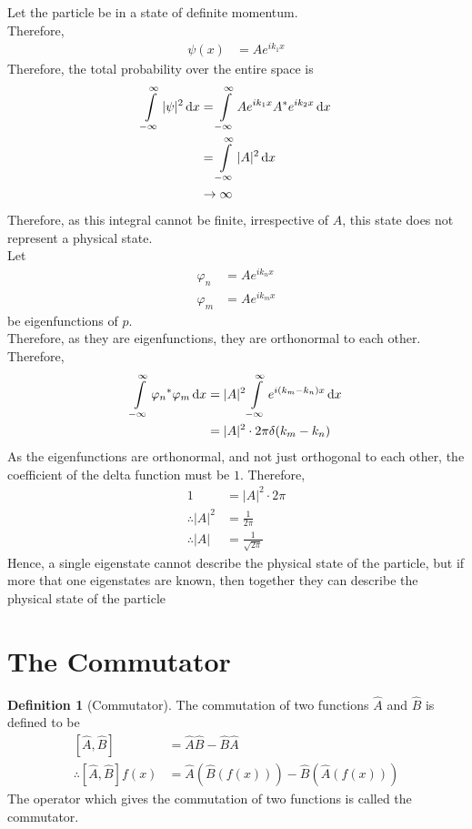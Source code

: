 \documentclass[titlepage, fleqn, a4paper, 12pt, twoside]{article}
\theoremstyle{definition}
\newtheorem{definition}{Definition}
\theoremstyle{theorem}
\begin{document}
Let the particle be in a state of definite momentum.\\
Therefore,
\begin{align*}
	\psi(x) &= A e^{i k_1 x}
\end{align*}
Therefore, the total probability over the entire space is
\begin{align*}
	\int\limits_{-\infty}^{\infty} |\psi|^2 \dif x &= \int\limits_{-\infty}^{\infty} A e^{i k_1 x} A^* e^{i k_2 x} \dif x\\
	&= \int\limits_{-\infty}^{\infty} |A|^2 \dif x\\
	&\to \infty
\end{align*}
Therefore, as this integral cannot be finite, irrespective of $A$, this state does not represent a physical state.\\
Let
\begin{align*}
	\varphi_n &= A e^{i k_n x}\\
	\varphi_m &= A e^{i k_m x}
\end{align*}
be eigenfunctions of $\hat{p}$.\\
Therefore, as they are eigenfunctions, they are orthonormal to each other.\\
Therefore,
\begin{align*}
	\int\limits_{-\infty}^{\infty} {\varphi_n}^* \varphi_m \dif x &= |A|^2 \int\limits_{-\infty}^{\infty} e^{i (k_m - k_n) x} \dif x\\
	&= |A|^2 \cdot 2 \pi \delta(k_m - k_n)
\end{align*}
As the eigenfunctions are orthonormal, and not just orthogonal to each other, the coefficient of the delta function must be $1$.
Therefore,
\begin{align*}
	1 &= |A|^2 \cdot 2 \pi\\
	\therefore |A|^2 &= \frac{1}{2 \pi}\\
	\therefore |A| &= \frac{1}{\sqrt{2 \pi}}
\end{align*}
Hence, a single eigenstate cannot describe the physical state of the particle, but if more that one eigenstates are known, then together they can describe the physical state of the particle

\section{The Commutator}

\begin{definition}[Commutator]
	The commutation of two functions $\hat{A}$ and $\hat{B}$ is defined to be
	\begin{align*}
		\left[ \hat{A} , \hat{B} \right] &= \hat{A} \hat{B} - \hat{B} \hat{A}\\
		\therefore \left[ \hat{A} , \hat{B} \right] f(x) &= \hat{A}\left( \hat{B}\left( f(x) \right) \right) - \hat{B}\left( \hat{A}\left( f(x) \right) \right)
	\end{align*}
	The operator which gives the commutation of two functions is called the commutator.
\end{definition}
\end{document}
